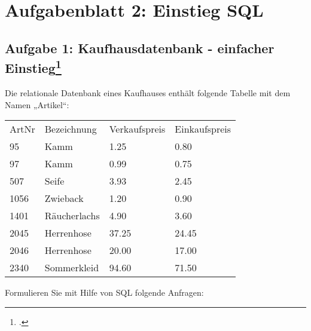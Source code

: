 \documentclass{lehramt-informatik-haupt}
\begin{document}
\chapter{Aufgabenblatt 2: Einstieg SQL}

%

\section{Aufgabe 1: Kaufhausdatenbank - einfacher Einstieg\footcite{db:ab:2}}

Die relationale Datenbank eines Kaufhauses enthält folgende Tabelle mit
dem Namen „Artikel“:

\begin{tabular}{llll}
ArtNr & Bezeichnung  & Verkaufspreis & Einkaufspreis \\
95    & Kamm         & 1.25          & 0.80          \\
97    & Kamm         & 0.99          & 0.75          \\
507   & Seife        & 3.93          & 2.45          \\
1056  & Zwieback     & 1.20          & 0.90          \\
1401  & Räucherlachs & 4.90          & 3.60          \\
2045  & Herrenhose   & 37.25         & 24.45         \\
2046  & Herrenhose   & 20.00         & 17.00         \\
2340  & Sommerkleid  & 94.60         & 71.50
\end{tabular}

Formulieren Sie mit Hilfe von SQL folgende Anfragen:
\end{document}
